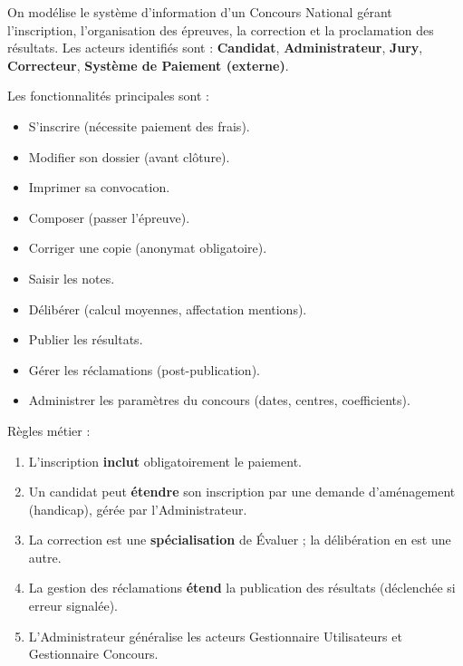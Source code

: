 \documentclass[11pt]{article}
\begin{document}
\begin{exercice}
\label{exo:uc_concours}
On modélise le système d'information d'un \og{}Concours National\fg{} gérant l'inscription, l'organisation des épreuves, la correction et la proclamation des résultats. Les acteurs identifiés sont : \textbf{Candidat}, \textbf{Administrateur}, \textbf{Jury}, \textbf{Correcteur}, \textbf{Système de Paiement (externe)}.

Les fonctionnalités principales sont :
\begin{itemize}
    \item S'inscrire (nécessite paiement des frais).
    \item Modifier son dossier (avant clôture).
    \item Imprimer sa convocation.
    \item Composer (passer l'épreuve).
    \item Corriger une copie (anonymat obligatoire).
    \item Saisir les notes.
    \item Délibérer (calcul moyennes, affectation mentions).
    \item Publier les résultats.
    \item Gérer les réclamations (post-publication).
    \item Administrer les paramètres du concours (dates, centres, coefficients).
\end{itemize}
Règles métier :
\begin{enumerate}
    \item L'inscription \textbf{inclut} obligatoirement le paiement.
    \item Un candidat peut \textbf{étendre} son inscription par une demande d'aménagement (handicap), gérée par l'Administrateur.
    \item La correction est une \textbf{spécialisation} de \og{}Évaluer\fg{} ; la délibération en est une autre.
    \item La gestion des réclamations \textbf{étend} la publication des résultats (déclenchée si erreur signalée).
    \item L'Administrateur généralise les acteurs \og{}Gestionnaire Utilisateurs\fg{} et \og{}Gestionnaire Concours\fg{}.
\end{enumerate}


\end{exercice}
\end{document}
